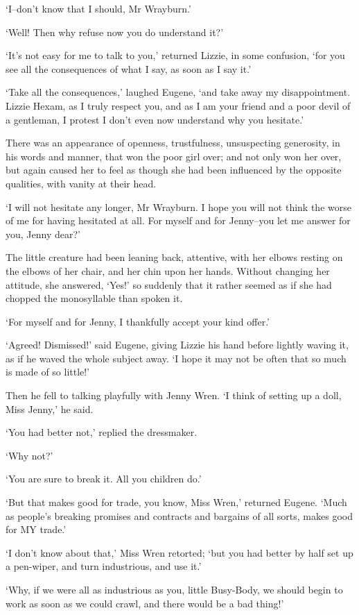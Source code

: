 ‘I--don’t know that I should, Mr Wrayburn.’

‘Well! Then why refuse now you do understand it?’

‘It’s not easy for me to talk to you,’ returned Lizzie, in some
confusion, ‘for you see all the consequences of what I say, as soon as I
say it.’

‘Take all the consequences,’ laughed Eugene, ‘and take away my
disappointment. Lizzie Hexam, as I truly respect you, and as I am your
friend and a poor devil of a gentleman, I protest I don’t even now
understand why you hesitate.’

There was an appearance of openness, trustfulness, unsuspecting
generosity, in his words and manner, that won the poor girl over; and
not only won her over, but again caused her to feel as though she had
been influenced by the opposite qualities, with vanity at their head.

‘I will not hesitate any longer, Mr Wrayburn. I hope you will not
think the worse of me for having hesitated at all. For myself and for
Jenny--you let me answer for you, Jenny dear?’

The little creature had been leaning back, attentive, with her elbows
resting on the elbows of her chair, and her chin upon her hands. Without
changing her attitude, she answered, ‘Yes!’ so suddenly that it rather
seemed as if she had chopped the monosyllable than spoken it.

‘For myself and for Jenny, I thankfully accept your kind offer.’

‘Agreed! Dismissed!’ said Eugene, giving Lizzie his hand before lightly
waving it, as if he waved the whole subject away. ‘I hope it may not be
often that so much is made of so little!’

Then he fell to talking playfully with Jenny Wren. ‘I think of setting
up a doll, Miss Jenny,’ he said.

‘You had better not,’ replied the dressmaker.

‘Why not?’

‘You are sure to break it. All you children do.’

‘But that makes good for trade, you know, Miss Wren,’ returned Eugene.
‘Much as people’s breaking promises and contracts and bargains of all
sorts, makes good for MY trade.’

‘I don’t know about that,’ Miss Wren retorted; ‘but you had better by
half set up a pen-wiper, and turn industrious, and use it.’

‘Why, if we were all as industrious as you, little Busy-Body, we should
begin to work as soon as we could crawl, and there would be a bad
thing!’

